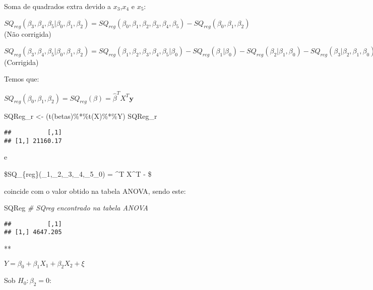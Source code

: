 \documentclass[
]{article}
\newenvironment{Shaded}{\begin{snugshade}}{\end{snugshade}}
\newcommand{\CommentTok}[1]{\textcolor[rgb]{0.56,0.35,0.01}{\textit{#1}}}
\newcommand{\FunctionTok}[1]{\textcolor[rgb]{0.00,0.00,0.00}{#1}}
\newcommand{\NormalTok}[1]{#1}
\newcommand{\OtherTok}[1]{\textcolor[rgb]{0.56,0.35,0.01}{#1}}
\newcommand{\SpecialCharTok}[1]{\textcolor[rgb]{0.00,0.00,0.00}{#1}}
\begin{document}
Soma de quadrados extra devido a \(x_3\),\(x_4\) e \(x_5\):

\(SQ_{reg}(\beta_3,\beta_4,\beta_5|\beta_0,\beta_1,\beta_2) = SQ_{reg}(\beta_0,\beta_1,\beta_2,\beta_3,\beta_4,\beta_5) - SQ_{reg}(\beta_0,\beta_1,\beta_2)\)
(Não corrigida)

\(SQ_{reg}(\beta_3,\beta_4,\beta_5|\beta_0,\beta_1,\beta_2) = SQ_{reg}(\beta_1,\beta_2,\beta_3,\beta_4,\beta_5|\beta_0) - SQ_{reg}(\beta_1|\beta_0) - SQ_{reg}(\beta_2|\beta_1, \beta_0) - SQ_{reg}(\beta_3|\beta_2,\beta_1,\beta_0)- SQ_{reg}(\beta_4|\beta_3,\beta_2,\beta_1,\beta_0) - SQ_{reg}(\beta_5|\beta_4,\beta_3,\beta_2,\beta_1,\beta_0)\)
(Corrigida)

Temos que:

\(SQ_{reg}(\beta_0,\beta_1,\beta_2) = SQ_{reg}(\beta) = \widehat{\beta}^T X^T \boldsymbol{y}\)

\begin{Shaded}
\begin{Highlighting}[]
\NormalTok{SQReg\_r }\OtherTok{\textless{}{-}}\NormalTok{ (}\FunctionTok{t}\NormalTok{(betas)}\SpecialCharTok{\%*\%}\FunctionTok{t}\NormalTok{(X)}\SpecialCharTok{\%*\%}\NormalTok{Y)}
\NormalTok{SQReg\_r}
\end{Highlighting}
\end{Shaded}

\begin{verbatim}
##          [,1]
## [1,] 21160.17
\end{verbatim}

e

\$SQ\_\{reg\}(\beta\_1,\beta\_2,\beta\_3,\beta\_4,\beta\_5\textbar{}\beta\_0)
= \widehat{\beta}\^{}T X\^{}T  -
 \$

coincide com o valor obtido na tabela ANOVA, sendo este:

\begin{Shaded}
\begin{Highlighting}[]
\NormalTok{SQReg }\CommentTok{\# SQreg encontrado na tabela ANOVA}
\end{Highlighting}
\end{Shaded}

\begin{verbatim}
##          [,1]
## [1,] 4647.205
\end{verbatim}

**

\(Y= \beta_0 + \beta_1X_1 + \beta_2X_2 + \xi\)

Sob \(H_0 : β_2 = 0\):
\end{document}
